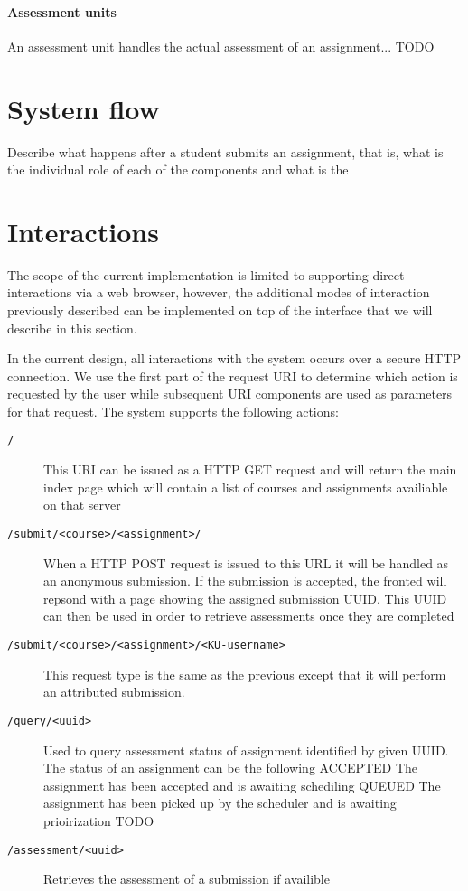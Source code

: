 \paragraph{Assessment units}
An assessment unit handles the actual assessment of an assignment... TODO

\section{System flow}
Describe what happens after a student submits an assignment, that is,
what is the individual role of each of the components and what is the 


\section{Interactions}
The scope of the current implementation is limited to supporting
direct interactions via a web browser, however, the additional modes
of interaction previously described can be implemented on top of the
interface that we will describe in this section.

In the current design, all interactions with the system occurs over a
secure HTTP connection. We use the first part of the request URI to
determine which action is requested by the user while subsequent URI
components are used as parameters for that request. The system
supports the following actions:

\begin{description}

\item[\texttt{/}] This URI can be issued as a HTTP GET request and
  will return the main index page which will contain a list of courses
  and assignments availiable on that server
\item[\texttt{/submit/<course>/<assignment>/}] When a HTTP POST
    request is issued to this URL it will be handled as an anonymous
    submission. If the submission is accepted, the fronted will
    repsond with a page showing the assigned submission UUID. This
    UUID can then be used in order to retrieve assessments once they
    are completed
\item[\texttt{/submit/<course>/<assignment>/<KU-username>}] This
  request type is the same as the previous except that it will perform
  an attributed submission.
\item[\texttt{/query/<uuid>}] Used to query assessment status of
  assignment identified by given UUID. The status of an assignment can
  be the following ACCEPTED The assignment has been accepted and is
  awaiting schediling QUEUED The assignment has been picked up by the
  scheduler and is awaiting prioirization TODO
\item[\texttt{/assessment/<uuid>}] Retrieves the assessment of a
  submission if availible
\end{description}

